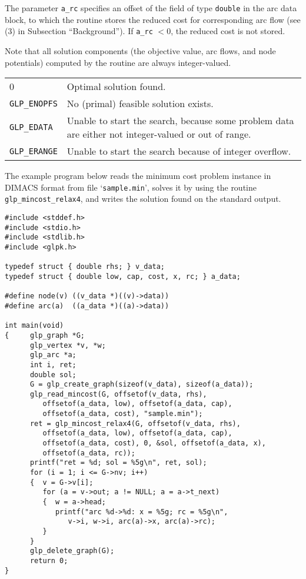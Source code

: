 \documentclass[11pt]{report}
\makeatletter
\def\para#1{\noindent{\bf#1}}
\def\returns{\para{Returns}}
\newenvironment{retlist}
{  \def\arraystretch{1.5}
   \noindent
   \begin{tabular}{@{}p{1in}@{}p{5.5in}@{}}
}
{\end{tabular}}
\makeatother
\begin{document}
The parameter \verb|a_rc| specifies an offset of the field of type
\verb|double| in the arc data block, to which the routine stores
the reduced cost for corresponding arc flow (see (3) in Subsection
``Background''). If \verb|a_rc| $<0$, the reduced cost is not stored.

Note that all solution components (the objective value, arc flows, and
node potentials) computed by the routine are always integer-valued.

\returns

\begin{retlist}
0 & Optimal solution found.\\

\verb|GLP_ENOPFS| & No (primal) feasible solution exists.\\

\verb|GLP_EDATA| & Unable to start the search, because some problem
data are either not integer-valued or out of range.\\

\verb|GLP_ERANGE| & Unable to start the search because of integer
overflow.\\
\end{retlist}

\para{Example}

The example program below reads the minimum cost problem instance in
DIMACS format from file `\verb|sample.min|', solves it by using the
routine \verb|glp_mincost_relax4|, and writes the solution found on the
standard output.

\begin{footnotesize}
\begin{verbatim}
#include <stddef.h>
#include <stdio.h>
#include <stdlib.h>
#include <glpk.h>

typedef struct { double rhs; } v_data;
typedef struct { double low, cap, cost, x, rc; } a_data;

#define node(v) ((v_data *)((v)->data))
#define arc(a)  ((a_data *)((a)->data))

int main(void)
{     glp_graph *G;
      glp_vertex *v, *w;
      glp_arc *a;
      int i, ret;
      double sol;
      G = glp_create_graph(sizeof(v_data), sizeof(a_data));
      glp_read_mincost(G, offsetof(v_data, rhs),
         offsetof(a_data, low), offsetof(a_data, cap),
         offsetof(a_data, cost), "sample.min");
      ret = glp_mincost_relax4(G, offsetof(v_data, rhs),
         offsetof(a_data, low), offsetof(a_data, cap),
         offsetof(a_data, cost), 0, &sol, offsetof(a_data, x),
         offsetof(a_data, rc));
      printf("ret = %d; sol = %5g\n", ret, sol);
      for (i = 1; i <= G->nv; i++)
      {  v = G->v[i];
         for (a = v->out; a != NULL; a = a->t_next)
         {  w = a->head;
            printf("arc %d->%d: x = %5g; rc = %5g\n",
               v->i, w->i, arc(a)->x, arc(a)->rc);
         }
      }
      glp_delete_graph(G);
      return 0;
}
\end{verbatim}
\end{footnotesize}
\end{document}

